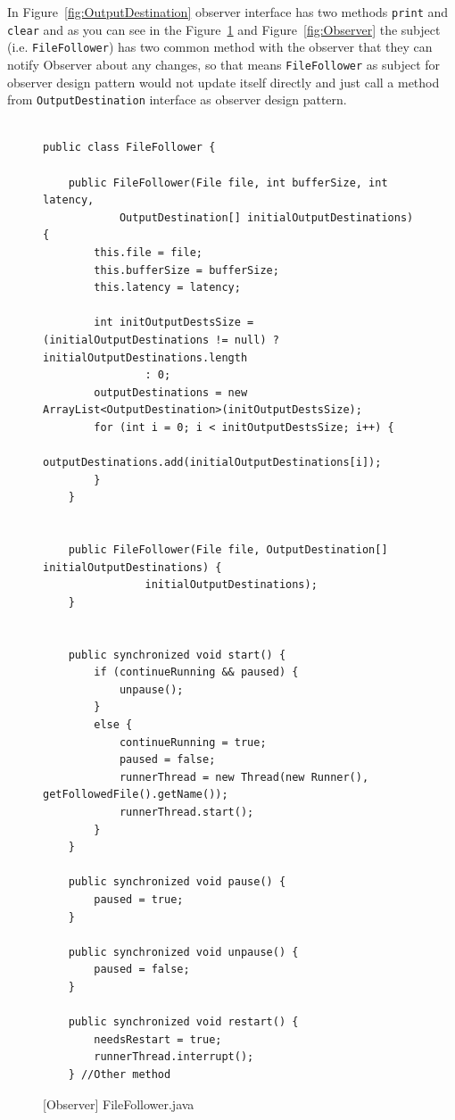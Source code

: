 
In Figure~\ref{fig:OutputDestination} observer interface has two methods \texttt{print} and \texttt{clear} and as you can see in the Figure~\ref{fig:FileFollower} and Figure~\ref{fig:Observer} the subject (i.e. \texttt{FileFollower}) has two common method with the observer that they can notify Observer about any changes, so that means \texttt{FileFollower} as subject for observer design pattern would not update itself directly and just call a method from \texttt{OutputDestination} interface as observer design pattern. 

\begin{figure}[htb]
\centering
\lstset{language=Java, basicstyle=\scriptsize, stepnumber=1, showspaces=false, showstringspaces=false,breaklines=true}
\begin{lstlisting}

public class FileFollower {

	public FileFollower(File file, int bufferSize, int latency,
	        OutputDestination[] initialOutputDestinations) {
		this.file = file;
		this.bufferSize = bufferSize;
		this.latency = latency;

		int initOutputDestsSize = (initialOutputDestinations != null) ? initialOutputDestinations.length
		        : 0;
		outputDestinations = new ArrayList<OutputDestination>(initOutputDestsSize);
		for (int i = 0; i < initOutputDestsSize; i++) {
			outputDestinations.add(initialOutputDestinations[i]);
		}
	}


	public FileFollower(File file, OutputDestination[] initialOutputDestinations) {
		        initialOutputDestinations);
	}


	public synchronized void start() {
		if (continueRunning && paused) {
			unpause();
		}
		else {
			continueRunning = true;
			paused = false;
			runnerThread = new Thread(new Runner(), getFollowedFile().getName());
			runnerThread.start();
		}
	}

	public synchronized void pause() {
		paused = true;
	}

	public synchronized void unpause() {
		paused = false;
	}

	public synchronized void restart() {
		needsRestart = true;
		runnerThread.interrupt();
	} //Other method

\end{lstlisting}
\caption{[Observer] FileFollower.java}
\label{fig:FileFollower}
\end{figure}
\FloatBarrier

